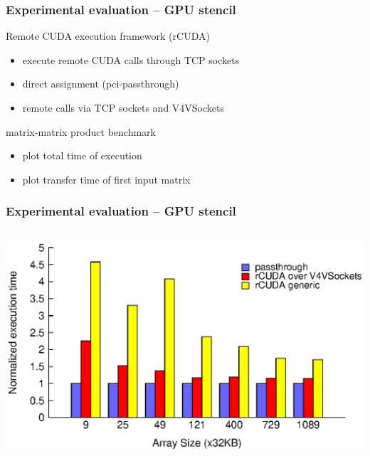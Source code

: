 \documentclass[red,slidestop,notes,compress,mathserif]{beamer}
\begin{document}
\begin{frame}

\frametitle{Experimental evaluation -- GPU stencil}
\begin{block}{Remote CUDA execution framework (rCUDA)}
\begin{itemize}
\item execute remote CUDA calls through TCP sockets
\item direct assignment (pci-passthrough)
\item remote calls via TCP sockets and V4VSockets
\end{itemize}
\end{block}
\begin{block}{matrix-matrix product benchmark}
\begin{itemize}
\item plot total time of execution
\item plot transfer time of first input matrix
\end{itemize}
\end{block}
\end{frame}

\begin{frame}
\frametitle{Experimental evaluation -- GPU stencil}
\begin{columns}
\includegraphics[width=\textwidth]{figures/total_cublas_time.eps}
\end{columns}
\end{frame}
\end{document}
